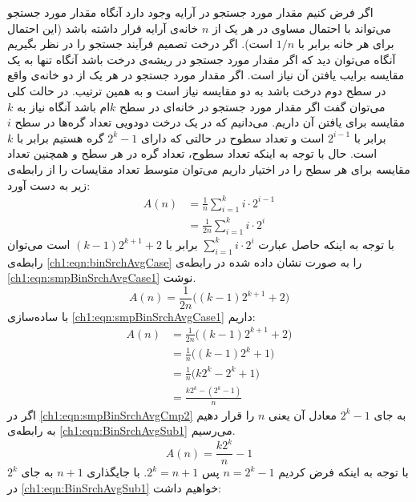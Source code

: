 {اگر فرض کنیم مقدار مورد جستجو در آرایه وجود دارد آنگاه مقدار مورد جستجو می‌تواند با احتمال مساوی در هر یک از {$n$} خانه‌ی آرایه قرار داشته باشد (این احتمال برای هر خانه برابر با {$1/n$} است). اگر درخت تصمیم فرآیند جستجو را در نظر بگیریم آنگاه می‌توان دید که اگر مقدار مورد جستجو در ریشه‌ی درخت باشد آنگاه تنها به یک مقایسه برایب یافتن آن نیاز است. اگر مقدار مورد جستجو در هر یک از دو خانه‌ی واقع در سطح دوم درخت باشد به دو مقایسه نیاز است و به همین ترتیب. در حالت کلی می‌توان گفت اگر مقدار مورد جستجو در خانه‌ای در سطح {$k$}ام باشد آنگاه نیاز به {$k$} مقایسه برای یافتن آن داریم. می‌دانیم که در یک درخت دودویی تعداد گره‌ها در سطح {$i$} برابر با {$2^{i-1}$} است و تعداد سطوح در حالتی که دارای {$2^{k}-1$} گره هستیم برابر با {$k$}  است. حال با توجه به اینکه تعداد سطوح، تعداد گره در هر سطح و همچنین تعداد مقایسه برای هر سطح را در اختیار داریم می‌توان متوسط تعداد مقایسات را از رابطه‌ی زیر به دست آورد:
\begin{align}
A(n) &= \frac{1}{n} \sum_{i=1}^{k}{i \cdot 2^{i-1}}\nonumber\\
&= \frac{1}{2n}\sum_{i=1}^{k}{i \cdot 2^{i}}\label{ch1:eqn:binSrchAvgCase}
\end{align}
با توجه به اینکه حاصل عبارت {$\sum_{i=1}^{k}{i \cdot 2^{i}}$} برابر با {$(k-1)2^{k+1} + 2$} است می‌توان رابطه‌ی {\eqref{ch1:eqn:binSrchAvgCase}} را به صورت نشان داده شده در رابطه‌ی {\eqref{ch1:eqn:smpBinSrchAvgCase1}} نوشت.
\begin{equation}
A(n)=\frac{1}{2n}\biggl( (k-1)2^{k+1} + 2 \biggr)\label{ch1:eqn:smpBinSrchAvgCase1}
\end{equation}
با ساده‌سازی {\eqref{ch1:eqn:smpBinSrchAvgCase1}} داریم:
\begin{align}
A(n) &= \frac{1}{2n}\biggl( (k-1)2^{k+1} + 2 \biggr) \nonumber\\
&= \frac{1}{n}\biggl( (k-1)2^{k} + 1 \biggr) \nonumber\\
&= \frac{1}{n}\biggl( k2^{k} -2^{k}  + 1 \biggr) \nonumber\\
&= \frac{k2^{k} - (2^{k}-1)}{n}\label{ch1:eqn:smpBinSrchAvgCmp2}
\end{align}
اگر در {\eqref{ch1:eqn:smpBinSrchAvgCmp2}} به جای {$2^{k}-1$} معادل آن یعنی {$n$} را قرار دهیم به رابطه‌ی {\eqref{ch1:eqn:BinSrchAvgSub1}} می‌رسیم.
\begin{equation}
A(n)=\frac{k2^{k}}{n} - 1\label{ch1:eqn:BinSrchAvgSub1}
\end{equation}
با توجه به اینکه فرض کردیم {$n=2^{k}-1$} پس {$2^k=n+1$}. با جایگذاری {$n+1$} به جای {$2^k$} در {\eqref{ch1:eqn:BinSrchAvgSub1}} خواهیم داشت:

}
